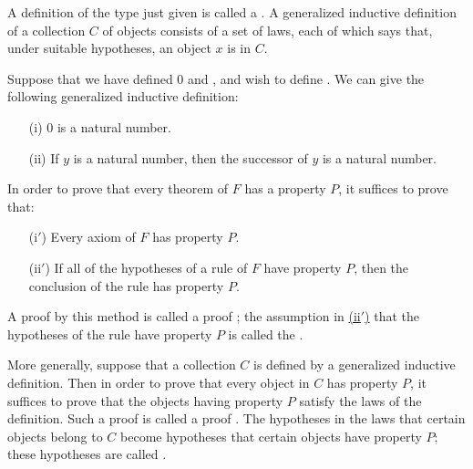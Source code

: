 A definition of the type just given is called a .
A generalized inductive definition of a collection $C$ of objects consists of a set of laws, each of which says that, under suitable hypotheses, an object $x$ is in $C$.

\begin{example}
Suppose that we have defined 0 and , and wish to define .
We can give the following generalized inductive definition:
\begin{enumerate}
    \item[(i)] 0 is a natural number.
    \item[(ii)] If $y$ is a natural number, then the successor of $y$ is a natural number.
\end{enumerate}
\end{example}

\begin{shaded*}
In order to prove that every theorem of $F$ has a property $P$, it suffices to prove that:
\begin{enumerate}
    \item[(i$'$)] Every axiom of $F$ has property $P$.
    \item[(ii$'$)\label{induction hypothesis}] If all of the hypotheses of a rule of $F$ have property $P$, then the conclusion of the rule has property $P$.
\end{enumerate}
\end{shaded*}

\begin{remark}
A proof by this method is called a proof ;
the assumption in \hyperref[induction hypothesis]{(ii$'$)} that the hypotheses of the rule have property $P$ is called the .
\end{remark}

More generally, suppose that a collection $C$ is defined by a generalized inductive definition.
Then in order to prove that every object in $C$ has property $P$, it suffices to prove that the objects having property $P$ satisfy the laws of the definition.
Such a proof is called a proof .
The hypotheses in the laws that certain objects belong to $C$ become hypotheses that certain objects have property $P$; these hypotheses are called .

